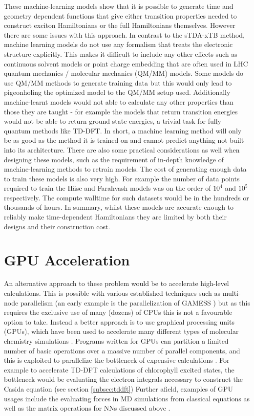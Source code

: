 These machine-learning models show that it is possible to generate time and geometry
dependent functions that give either transition properties needed to construct exciton
Hamiltonians or the full Hamiltonians themselves. However there are some issues 
with this approach. In contrast to the sTDA-xTB method, machine learning models 
do not use any formalism that treats the electronic structure explicitly. This makes 
it difficult to include any other effects such as continuous solvent models or point
charge embedding that are often used in LHC quantum mechanics / molecular mechanics
(QM/MM) models. Some models do use QM/MM methods to generate training data but this
would only lead to pigeonholing the optimized model to the QM/MM setup used. Additionally
machine-learnt models would not able to calculate any other properties than those 
they are taught - for example the models that return \Qy transition energies would 
not be able to return ground state energies, a trivial task for fully quantum methods
like TD-DFT. In short, a machine learning method will only be as good as the method
it is trained on and cannot predict anything not built into its architecture. There
are also some practical considerations as well when designing these models, such
as the requirement of in-depth knowledge of machine-learning methods to retrain 
models. The cost of generating enough data to train these models is also very high.
For example the number of data points required to train the H\"{a}se and Farahvash 
models was on the order of $10^4$ and $10^5$ respectively. The compute walltime 
for such datasets would be in the hundreds or thousands of hours. In summary, whilst these
models are accurate enough to reliably make time-dependent Hamiltonians they are
 limited by both their designs and their construction cost.

\section{GPU Acceleration}
\label{sec:gpu_acceleration}

An alternative approach to these problem would be to accelerate high-level calculations.
This is possible with various established techniques such as multi-node parallelism
(an early example is the parallelization of GAMESS \cite{Fletcher2000}) but as this 
requires the exclusive use of many (dozens) of CPUs this is not a favourable option 
to take. Instead a better approach is to use graphical processing units (GPUs), 
which have been used to accelerate many different types of molecular chemistry simulations \cite{Pandey2022}.
Programs written for GPUs can partition a limited number of basic operations over 
a massive number of parallel components, and this is exploited to parallelize the
bottleneck of expensive calculations \cite{McIntosh-Smith2013}. For example to accelerate
TD-DFT calculations of chlorophyll excited states, the bottleneck would be evaluating
the electron integrals necessary to construct the Casida equation (see section \ref{subsec:tddft})
Further afield, examples of GPU usages include the evaluating forces in MD simulations
from classical equations as well as the matrix operations for NNs discussed above \cite{Ufimtsev2008, Friedrichs2009, Wu2012}.


